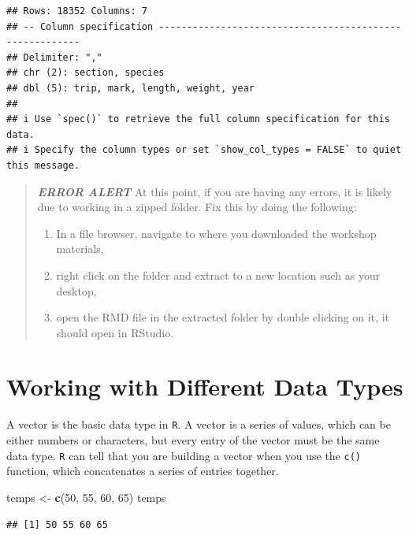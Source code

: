 \documentclass[
  10pt,
  letterpaper,
  twoside,
  openright]{book}
\newenvironment{Shaded}{\begin{snugshade}}{\end{snugshade}}
\newcommand{\DecValTok}[1]{\textcolor[rgb]{0.00,0.00,0.81}{#1}}
\newcommand{\FunctionTok}[1]{\textcolor[rgb]{0.13,0.29,0.53}{\textbf{#1}}}
\newcommand{\NormalTok}[1]{#1}
\newcommand{\OtherTok}[1]{\textcolor[rgb]{0.56,0.35,0.01}{#1}}
\providecommand{\tightlist}{%
  \setlength{\itemsep}{0pt}\setlength{\parskip}{0pt}}
\begin{document}
\begin{verbatim}
## Rows: 18352 Columns: 7
## -- Column specification --------------------------------------------------------
## Delimiter: ","
## chr (2): section, species
## dbl (5): trip, mark, length, weight, year
## 
## i Use `spec()` to retrieve the full column specification for this data.
## i Specify the column types or set `show_col_types = FALSE` to quiet this message.
\end{verbatim}

\begin{quote}
\textbf{\emph{ERROR ALERT}} At this point, if you are having any errors,
it is likely due to working in a zipped folder. Fix this by doing the
following:

\begin{enumerate}
\def\labelenumi{\arabic{enumi}.}
\tightlist
\item
  In a file browser, navigate to where you downloaded the workshop
  materials,
\item
  right click on the folder and extract to a new location such as your
  desktop,
\item
  open the RMD file in the extracted folder by double clicking on it, it
  should open in RStudio.
\end{enumerate}
\end{quote}

\hypertarget{working-with-different-data-types}{%
\section{Working with Different Data
Types}\label{working-with-different-data-types}}

A vector is the basic data type in \texttt{R}. A vector is a series of
values, which can be either numbers or characters, but every entry of
the vector must be the same data type. \texttt{R} can tell that you are
building a vector when you use the \texttt{c()} function, which
concatenates a series of entries together.

\begin{Shaded}
\begin{Highlighting}[]
\NormalTok{temps }\OtherTok{\textless{}{-}} \FunctionTok{c}\NormalTok{(}\DecValTok{50}\NormalTok{, }\DecValTok{55}\NormalTok{, }\DecValTok{60}\NormalTok{, }\DecValTok{65}\NormalTok{)}
\NormalTok{temps}
\end{Highlighting}
\end{Shaded}

\begin{verbatim}
## [1] 50 55 60 65
\end{verbatim}
\end{document}
